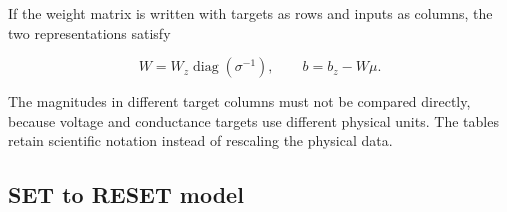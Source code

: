 \documentclass[11pt,a4paper]{article}
\begin{document}
If the weight matrix is written with targets as rows and inputs as columns, the two
representations satisfy

\[W=W_z\operatorname{diag}(\sigma^{-1}),\qquad
b=b_z-W\mu.
\]

The magnitudes in different target columns must not be compared directly, because voltage and conductance targets use different physical units. The tables retain scientific notation instead of rescaling the physical data.

\subsection{SET to RESET model}

\begin{table}[H]
\centering
\scriptsize
\caption{Internal standardized-input augmented matrix $B_z$ for
$\mathrm{SET}_n\rightarrow\mathrm{RESET}_n$.}
\end{table}
\end{document}

